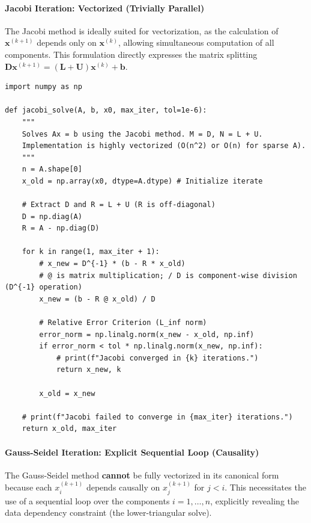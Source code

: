 \paragraph{Jacobi Iteration: Vectorized (Trivially Parallel)}
The Jacobi method is ideally suited for vectorization, as the calculation of $\mathbf{x}^{(k+1)}$ depends only on $\mathbf{x}^{(k)}$, allowing simultaneous computation of all components. This formulation directly expresses the matrix splitting $\mathbf{D}\mathbf{x}^{(k+1)} = (\mathbf{L}+\mathbf{U})\mathbf{x}^{(k)} + \mathbf{b}$.

\begin{verbatim}
import numpy as np

def jacobi_solve(A, b, x0, max_iter, tol=1e-6):
    """
    Solves Ax = b using the Jacobi method. M = D, N = L + U.
    Implementation is highly vectorized (O(n^2) or O(n) for sparse A).
    """
    n = A.shape[0]
    x_old = np.array(x0, dtype=A.dtype) # Initialize iterate
    
    # Extract D and R = L + U (R is off-diagonal)
    D = np.diag(A)
    R = A - np.diag(D)
    
    for k in range(1, max_iter + 1):
        # x_new = D^{-1} * (b - R * x_old)
        # @ is matrix multiplication; / D is component-wise division (D^{-1} operation)
        x_new = (b - R @ x_old) / D 
        
        # Relative Error Criterion (L_inf norm)
        error_norm = np.linalg.norm(x_new - x_old, np.inf)
        if error_norm < tol * np.linalg.norm(x_new, np.inf):
            # print(f"Jacobi converged in {k} iterations.")
            return x_new, k
            
        x_old = x_new
        
    # print(f"Jacobi failed to converge in {max_iter} iterations.")
    return x_old, max_iter
\end{verbatim}

\paragraph{Gauss-Seidel Iteration: Explicit Sequential Loop (Causality)}
The Gauss-Seidel method \textbf{cannot} be fully vectorized in its canonical form because each $x_i^{(k+1)}$ depends causally on $x_j^{(k+1)}$ for $j < i$. This necessitates the use of a sequential loop over the components $i = 1, \dots, n$, explicitly revealing the data dependency constraint (the lower-triangular solve).


